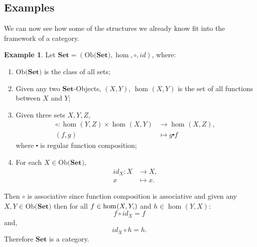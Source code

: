 \documentclass[11pt,a4paper]{article}
\theoremstyle{definition}
\newtheorem{example}[thm]{Example}
\newcommand\ho[3][]{\hom_{#1}(#2,#3)}
\newcommand\ob[1]{\mathrm{Ob(}#1\mathrm{)}}
\newcommand\objs[1]{#1-Objects}
\numberwithin{equation}{section}
\begin{document}
\subsection{Examples}
\label{ss:catexamples}
We can now see how some of the structures we already know fit into the framework of a category.
\begin{example}
\label{exe:catofsets}
Let $\mathbf{Set} = (\ob{\mathbf{Set}}, \hom, \circ, id)$, where:
\begin{enumerate}
    \item $\ob{\mathbf{Set}}$ is the class of all sets;
    \item Given any two \objs{$\mathbf{Set}$}, $(X,Y)$, $\ho{X}{Y}$ is the set of all functions between $X$ and $Y$;
    \item Given three sets $X,Y,Z$,
    \begin{align*}
        \circ\colon\ho{Y}{Z}\times\ho{X}{Y}&\rightarrow\ho{X}{Z},\\
        (f,g)&\mapsto g\centerdot f
    \end{align*}
    where $\centerdot$ is regular function composition;
    \item For each $X\in\ob{\mathbf{Set}}$,
    \begin{align*}
        id_{X}\colon X&\rightarrow X,\\
        x&\mapsto x.
    \end{align*}
\end{enumerate}
Then $\circ$ is associative since function composition is associative and given any $X,Y\in\ob{\mathbf{Set}}$ then for all $f\in\ho{X,Y}$ and $h\in\ho{Y}{X}$: \[f\circ id_{X} = f\] and, \[id_{X}\circ h = h.\]
Therefore $\mathbf{Set}$ is a category.
\end{example}
\end{document}
